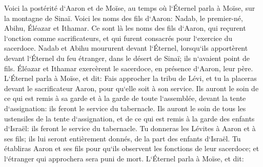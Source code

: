 \verse Voici la postérité d`Aaron et de Moïse, au temps où l`Éternel parla à Moïse, sur la montagne de Sinaï. 
\verse Voici les noms des fils d`Aaron: Nadab, le premier-né, Abihu, Éléazar et Ithamar. 
\verse Ce sont là les noms des fils d`Aaron, qui reçurent l`onction comme sacrificateurs, et qui furent consacrés pour l`exercice du sacerdoce. 
\verse Nadab et Abihu moururent devant l`Éternel, lorsqu`ils apportèrent devant l`Éternel du feu étranger, dans le désert de Sinaï; ils n`avaient point de fils. Éléazar et Ithamar exercèrent le sacerdoce, en présence d`Aaron, leur père. 
\verse L`Éternel parla à Moïse, et dit: 
\verse Fais approcher la tribu de Lévi, et tu la placeras devant le sacrificateur Aaron, pour qu`elle soit à son service. 
\verse Ils auront le soin de ce qui est remis à sa garde et à la garde de toute l`assemblée, devant la tente d`assignation: ils feront le service du tabernacle. 
\verse Ils auront le soin de tous les ustensiles de la tente d`assignation, et de ce qui est remis à la garde des enfants d`Israël: ils feront le service du tabernacle. 
\verse Tu donneras les Lévites à Aaron et à ses fils; ils lui seront entièrement donnés, de la part des enfants d`Israël. 
\verse Tu établiras Aaron et ses fils pour qu`ils observent les fonctions de leur sacerdoce; et l`étranger qui approchera sera puni de mort. 
\verse L`Éternel parla à Moïse, et dit: 
